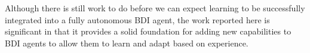 Although there is still work to do before we can expect learning to be
successfully integrated into a fully autonomous BDI agent, the
work reported here is significant in that it provides a solid
foundation for adding new capabilities to BDI agents to allow them to
learn and adapt based on experience.

